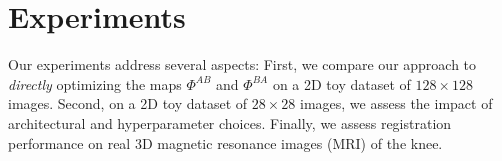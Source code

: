 \documentclass[10pt,twocolumn,letterpaper]{article} %
\begin{document}




\section{Experiments}
\label{section:experiments}

Our experiments address several aspects:  First, we compare our approach to \emph{directly} optimizing the maps $\Phi^{AB}$ and $\Phi^{BA}$ on a 2D toy dataset of $128 \times 128$ images. Second, on a 2D toy dataset of $28 \times 28$ images, we assess the impact of architectural and hyperparameter choices. Finally, we assess registration performance on real 3D magnetic resonance images (MRI) of the knee. 
\end{document}
